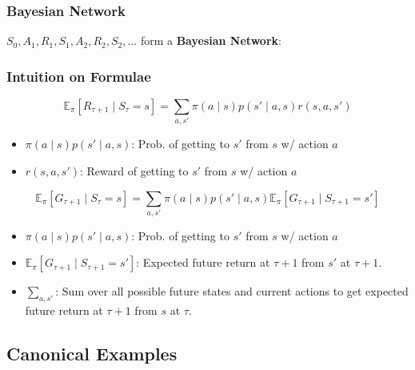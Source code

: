 \subsubsection{Bayesian Network}
\begin{notes}
    $S_0,A_1,R_1,S_1,A_2,R_2,S_2,\ldots$ form a \textbf{Bayesian Network}:
\end{notes}

\subsubsection{Intuition on Formulae}
\begin{notes}
    \begin{equation*}
        \mathbb{E}_{\pi}[R_{\tau+1} \mid S_{\tau} = s] = \sum_{a, s'} \pi(a \mid s) p(s' \mid a, s) r(s, a, s')
    \end{equation*}
    \begin{itemize}
        \item $\pi(a \mid s) p(s' \mid a, s)$: Prob. of getting to $s'$ from $s$ w/ action $a$
        \item $r(s, a, s')$: Reward of getting to $s'$ from $s$ w/ action $a$
    \end{itemize}
    \vspace{1em}

    \begin{equation*}
        \mathbb{E}_{\pi}[G_{\tau+1} \mid S_{\tau} = s] = \sum_{a, s'} \pi(a \mid s) p(s' \mid a, s) \mathbb{E}_{\pi}[G_{\tau+1} \mid S_{\tau+1} = s']
    \end{equation*}
    \begin{itemize}
        \item $\pi(a \mid s) p(s' \mid a, s)$: Prob. of getting to $s'$ from $s$ w/ action $a$
        \item $\mathbb{E}_{\pi}[G_{\tau+1} \mid S_{\tau+1} = s']$: Expected future return at $\tau + 1$ from $s'$ at $\tau + 1$.
        \item $\sum_{a, s'}$: Sum over all possible future states and current actions to get expected future return at $\tau + 1$ from $s$ at $\tau$.
    \end{itemize}
\end{notes}
\newpage

\subsection{Canonical Examples}
